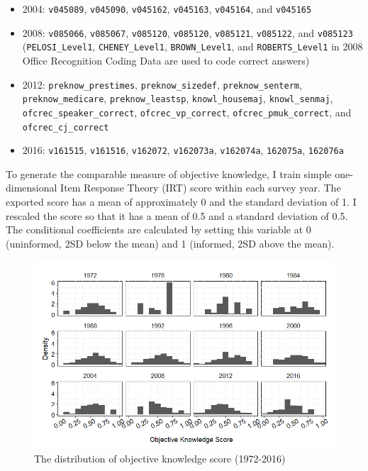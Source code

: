 \begin{itemize}
    \item 2004: \texttt{v045089}, \texttt{v045090}, \texttt{v045162}, \texttt{v045163}, \texttt{v045164}, and \texttt{v045165}
    \item 2008: \texttt{v085066}, \texttt{v085067}, \texttt{v085120}, \texttt{v085120}, \texttt{v085121}, \texttt{v085122}, and \texttt{v085123} (\texttt{PELOSI\_Level1}, \texttt{CHENEY\_Level1}, \texttt{BROWN\_Level1}, and \texttt{ROBERTS\_Level1} in 2008 Office Recognition Coding Data are used to code correct answers)
    \item 2012: \texttt{preknow\_prestimes}, \texttt{preknow\_sizedef}, \texttt{preknow\_senterm}, \texttt{preknow\_medicare}, \texttt{preknow\_leastsp}, \texttt{knowl\_housemaj}, \texttt{knowl\_senmaj}, \texttt{ofcrec\_speaker\_correct}, \texttt{ofcrec\_vp\_correct}, \texttt{ofcrec\_pmuk\_correct}, and \texttt{ofcrec\_cj\_correct}
    \item 2016: \texttt{v161515}, \texttt{v161516}, \texttt{v162072}, \texttt{v162073a}, \texttt{v162074a}, \texttt{162075a}, \texttt{162076a}
\end{itemize}

\noindent To generate the comparable measure of objective knowledge, I train simple one-dimensional Item Response Theory (IRT) score within each survey year. The exported score has a mean of approximately 0 and the standard deviation of 1. I rescaled the score so that it has a mean of 0.5 and a standard deviation of 0.5. The conditional coefficients are calculated by setting this variable at 0 (uninformed, 2SD below the mean) and 1 (informed, 2SD above the mean). 

\begin{figure}[ht!!!]
    \caption{The distribution of objective knowledge score (1972-2016)}
    \label{fig:anes_objkndist}
    \includegraphics[width=\linewidth]{../outputs/anes_objkndist.png}
\end{figure}

